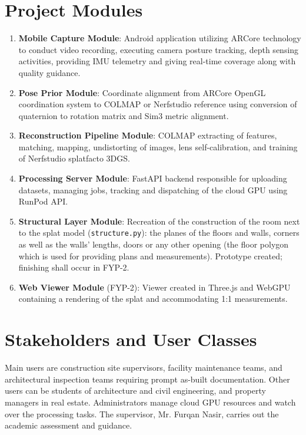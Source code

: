 \section{Project Modules}
\begin{enumerate}
    \item \textbf{Mobile Capture Module}: Android application utilizing ARCore technology to conduct video recording, executing camera posture tracking, depth sensing activities, providing IMU telemetry and giving real-time coverage along with quality guidance.
    \item \textbf{Pose Prior Module}: Coordinate alignment from ARCore OpenGL coordination system to COLMAP or Nerfstudio reference using conversion of quaternion to rotation matrix and Sim3 metric alignment.
    \item \textbf{Reconstruction Pipeline Module}: COLMAP extracting of features, matching, mapping, undistorting of images, lens self-calibration, and training of Nerfstudio splatfacto 3DGS.
    \item \textbf{Processing Server Module}: FastAPI backend responsible for uploading datasets, managing jobs, tracking and dispatching of the cloud GPU using RunPod API.
    \item \textbf{Structural Layer Module}: Recreation of the construction of the room next to the splat model (\texttt{structure.py}): the planes of the floors and walls, corners as well as the walls' lengths, doors or any other opening (the floor polygon which is used for providing plans and measurements). Prototype created; finishing shall occur in FYP-2.
    \item \textbf{Web Viewer Module} (FYP-2): Viewer created in Three.js and WebGPU containing a rendering of the splat and accommodating 1:1 measurements.
\end{enumerate}

\section{Stakeholders and User Classes}
Main users are construction site supervisors, facility maintenance teams, and architectural inspection teams requiring prompt as-built documentation. Other users can be students of architecture and civil engineering, and property managers in real estate. Administrators manage cloud GPU resources and watch over the processing tasks. The supervisor, Mr. Furqan Nasir, carries out the academic assessment and guidance.

